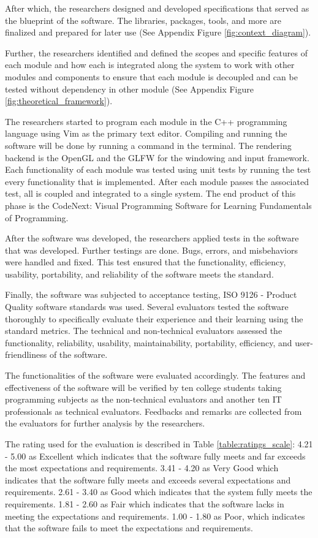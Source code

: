 \parx
After which, the researchers designed and developed specifications that served
as the blueprint of the software. The libraries, packages, tools, and more are
finalized and prepared for later use (See Appendix Figure
\ref{fig:context_diagram}).

\parx
Further, the researchers identified and defined the scopes and specific
features of each module and how each is integrated along the system to work
with other modules and components to ensure that each module is decoupled and
can be tested without dependency in other module (See Appendix Figure
\ref{fig:theoretical_framework}).

\parx
The researchers started to program each module in the C++ programming
language using Vim as the primary text editor. Compiling and running the
software will be done by running a command in the terminal. The rendering
backend is the OpenGL and the GLFW for the windowing and input framework. Each
functionality of each module was tested using unit tests by running the
test every functionality that is implemented. After each module passes
the associated test, all is coupled and integrated to a single system. The
end product of this phase is the CodeNext: Visual Programming Software for
Learning Fundamentals of Programming.

\parx
After the software was developed, the researchers applied tests in the software
that was developed.  Further testings are done. Bugs, errors, and misbehaviors
were handled and fixed. This test ensured that the functionality, efficiency,
usability, portability, and reliability of the software meets the standard.

\parx
Finally, the software was subjected to acceptance testing, ISO 9126 - Product Quality
software standards was used. Several evaluators tested the software thoroughly
to specifically evaluate their experience and their learning using the standard
metrics. The technical and non-technical evaluators assessed the functionality,
reliability, usability, maintainability, portability, efficiency, and
user-friendliness of the software.

\parx
The functionalities of the software were evaluated accordingly. The
features and effectiveness of the software will be verified by ten college
students taking programming subjects as the non-technical evaluators and another ten
IT professionals as technical evaluators. Feedbacks and remarks are collected from the
evaluators for further analysis by the researchers.

\parx
The rating used for the evaluation is described in Table \ref{table:ratings_scale}:
4.21 - 5.00 as Excellent which indicates that the
software fully meets and far exceeds the most expectations and requirements.
3.41 - 4.20 as Very Good which indicates that the software fully meets and exceeds
several expectations and requirements. 2.61 - 3.40 as Good which indicates that the
system fully meets the requirements. 1.81 - 2.60 as Fair which indicates that the software
lacks in meeting the expectations and requirements. 1.00 - 1.80 as Poor, which
indicates that the software fails to meet the expectations and requirements.

